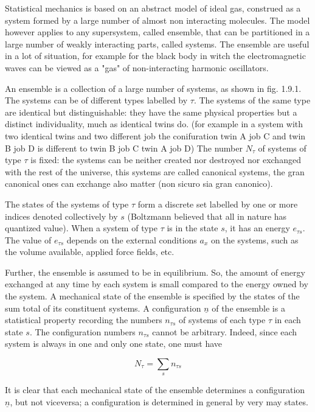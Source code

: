 \documentclass{article}
\begin{document}
Statistical mechanics is based on an abstract model of ideal gas, construed as a system formed by a large number of almost non interacting molecules. The model however applies to any supersystem, called ensemble, that can be partitioned in a large number of weakly interacting parts, called systems. The ensemble are useful in a lot of situation, for example for the black body in witch the electromagnetic waves can be viewed as a "gas" of non-interacting harmonic oscillators.

An ensemble is a collection of a large number of systems, as shown in fig. 1.9.1. The systems can be of different types labelled by $\tau$. The systems of the same type are identical but distinguishable: they have the same physical properties but a distinct individuality, much as identical twins do. (for example in a system with two identical twins and two different job the conifuration twin A job C and twin B job D is different to twin B job C twin A job D) The number $N_{\tau}$ of systems of type $\tau$ is fixed: the systems can be neither created nor destroyed nor exchanged with the rest of the universe, this systems are called canonical systems, the gran canonical ones can exchange also matter (non sicuro sia gran canonico).

The states of the systems of type $\tau$ form a discrete set labelled by one or more indices denoted collectively by $s$ (Boltzmann believed that all in nature has quantized value). When a system of type $\tau$ is in the state $s$, it has an energy $e_{\tau s}$. The value of $e_{\tau s}$ depends on the external conditions $a_{x}$ on the systems, such as the volume available, applied force fields, etc.

Further, the ensemble is assumed to be in equilibrium. So, the amount of energy exchanged at any time by each system is small compared to the energy owned by the system. A mechanical state of the ensemble is specified by the states of the sum total of its constituent systems. A configuration $\underline{n}$ of the ensemble is a statistical property recording the numbers $n_{\tau s}$ of systems of each type $\tau$ in each state $s$. The configuration numbers $n_{\tau s}$ cannot be arbitrary. Indeed, since each system is always in one and only one state, one must have
 
\begin{equation*}
N_{\tau}=\sum_{s} n_{\tau s} \tag{1.9.1}
\end{equation*}
 

It is clear that each mechanical state of the ensemble determines a configuration $\underline{n}$, but not viceversa; a configuration is determined in general by very may states.
\end{document}

